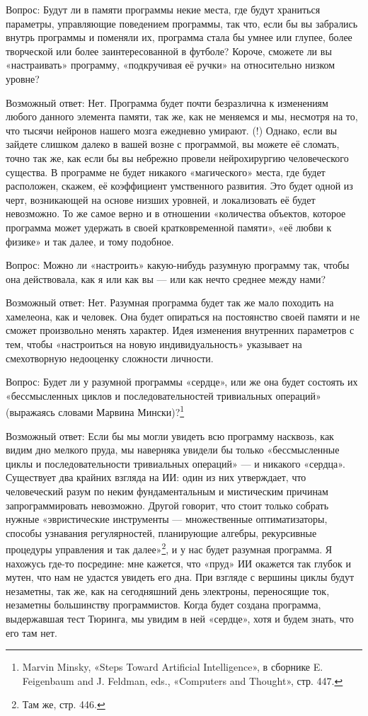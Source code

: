\documentclass[../main.tex]{subfiles}
\begin{document}
Вопрос: Будут ли в памяти программы некие места, где будут храниться параметры, управляющие поведением программы, так что, если бы вы забрались внутрь программы и поменяли их, программа стала бы умнее или глупее, более творческой или более заинтересованной в футболе? Короче, сможете ли вы «настраивать» программу, «подкручивая её ручки» на относительно низком уровне?

Возможный ответ: Нет. Программа будет почти безразлична к изменениям любого данного элемента памяти, так же, как не меняемся и мы, несмотря на то, что тысячи нейронов нашего мозга ежедневно умирают. (!) Однако, если вы зайдете слишком далеко в вашей возне с программой, вы можете её сломать, точно так же, как если бы вы небрежно провели нейрохирургию человеческого существа. В программе не будет никакого «магического» места, где будет расположен, скажем, её коэффициент умственного развития. Это будет одной из черт, возникающей на основе низших уровней, и локализовать её будет невозможно. То же самое верно и в отношении «количества объектов, которое программа может удержать в своей кратковременной памяти», «её любви к физике» и так далее, и тому подобное.

Вопрос: Можно ли «настроить» какую-нибудь разумную программу так, чтобы она действовала, как я или как вы --- или как нечто среднее между нами?

Возможный ответ: Нет. Разумная программа будет так же мало походить на хамелеона, как и человек. Она будет опираться на постоянство своей памяти и не сможет произвольно менять характер. Идея изменения внутренних параметров с тем, чтобы «настроиться на новую индивидуальность» указывает на смехотворную недооценку сложности личности.

Вопрос: Будет ли у разумной программы «сердце», или же она будет состоять их «бессмысленных циклов и последовательностей тривиальных операций» (выражаясь словами Марвина Мински)?\footnote{Marvin Minsky, «Steps Toward Artificial Intelligence», в сборнике E. Feigenbaum and J. Feldman, eds., «Computers and Thought», стр. 447.}

Возможный ответ: Если бы мы могли увидеть всю программу насквозь, как видим дно мелкого пруда, мы наверняка увидели бы только «бессмысленные циклы и последовательности тривиальных операций» --- и никакого «сердца». Существует два крайних взгляда на ИИ: один из них утверждает, что человеческий разум по неким фундаментальным и мистическим причинам запрограммировать невозможно. Другой говорит, что стоит только собрать нужные «эвристические инструменты --- множественные оптиматизаторы, способы узнавания регулярностей, планирующие алгебры, рекурсивные процедуры управления и так далее»\footnote{Там же, стр. 446.}, и у нас будет разумная программа. Я нахожусь где-то посредине: мне кажется, что «пруд» ИИ окажется так глубок и мутен, что нам не удастся увидеть его дна. При взгляде с вершины циклы будут незаметны, так же, как на сегодняшний день электроны, переносящие ток, незаметны большинству программистов. Когда будет создана программа, выдержавшая тест Тюринга, мы увидим в ней «сердце», хотя и будем знать, что его там нет.
\end{document}
